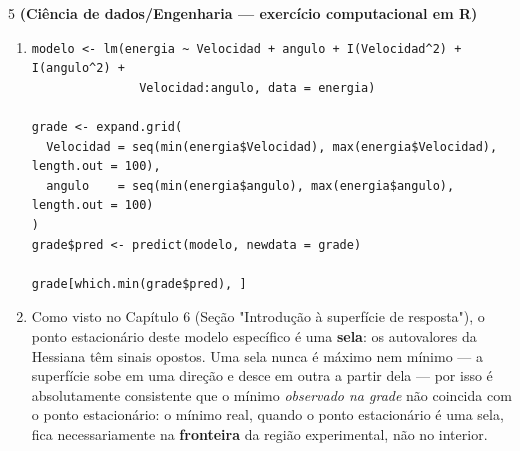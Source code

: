 \documentclass[11pt]{article}
\begin{document}
\begin{questao}{5} \textbf{(Ciência de dados/Engenharia --- exercício computacional em R)}
\end{questao}
\begin{solucao}
\begin{enumerate}[label=(\alph*)]
  \item
  \begin{lstlisting}
modelo <- lm(energia ~ Velocidad + angulo + I(Velocidad^2) + I(angulo^2) +
               Velocidad:angulo, data = energia)

grade <- expand.grid(
  Velocidad = seq(min(energia$Velocidad), max(energia$Velocidad), length.out = 100),
  angulo    = seq(min(energia$angulo), max(energia$angulo), length.out = 100)
)
grade$pred <- predict(modelo, newdata = grade)

grade[which.min(grade$pred), ]
  \end{lstlisting}
  \item Como visto no Capítulo 6 (Seção "Introdução à superfície de resposta"), o ponto
    estacionário deste modelo específico é uma \textbf{sela}: os autovalores da Hessiana têm
    sinais opostos. Uma sela nunca é máximo nem mínimo --- a superfície sobe em uma direção e
    desce em outra a partir dela --- por isso é absolutamente consistente que o mínimo
    \emph{observado na grade} não coincida com o ponto estacionário: o mínimo real, quando o
    ponto estacionário é uma sela, fica necessariamente na \textbf{fronteira} da região
    experimental, não no interior.
\end{enumerate}
\end{solucao}
\end{document}
